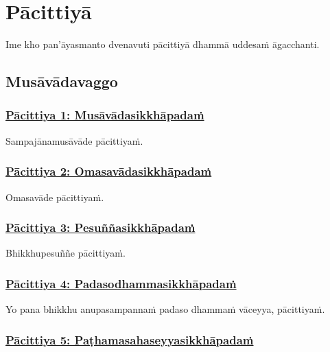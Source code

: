 \section{Pācittiyā}
\label{pc}

\begin{intro}
  Ime kho pan'āyasmanto dvenavuti pācittiyā dhammā uddesaṁ āgacchanti.
\end{intro}

\subsection{Musāvādavaggo}
\vspace{0.2cm}

\subsubsection*{\hyperref[exp1]{Pācittiya 1: Musāvādasikkhāpadaṁ}}
\label{pac1}

Sampajānamusāvāde pācittiyaṁ.

\subsubsection*{\hyperref[exp2]{Pācittiya 2: Omasavādasikkhāpadaṁ}}
\label{pac2}

Omasavāde pācittiyaṁ.

\subsubsection*{\hyperref[exp3]{Pācittiya 3: Pesuññasikkhāpadaṁ}}
\label{pac3}

Bhikkhupesuññe pācittiyaṁ.

\subsubsection*{\hyperref[exp4]{Pācittiya 4: Padasodhammasikkhāpadaṁ}}
\label{pac4}

Yo pana bhikkhu anupasampannaṁ padaso dhammaṁ vāceyya, pācittiyaṁ.

\subsubsection*{\hyperref[exp5]{Pācittiya 5: Paṭhamasahaseyyasikkhāpadaṁ}}
\label{pac5}


